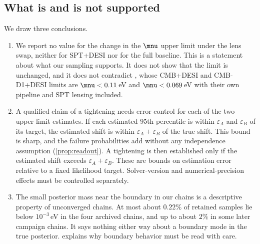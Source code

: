 \subsection{What is and is not supported}
We draw three conclusions.
\begin{enumerate}[leftmargin=*, itemsep=2pt]
  \item We report no value for the change in the $\mnu$ upper limit under the lens swap, neither for SPT+DESI nor for the full baseline. This is a statement about what our sampling supports. It does not show that the limit is unchanged, and it does not contradict \cite{arxiv2601_16277}, whose CMB+DESI and CMB-D1+DESI limits are $\mnu<0.11$\,eV and $\mnu<0.069$\,eV with their own pipeline and SPT lensing included.
  \item A qualified claim of a tightening needs error control for each of the two upper-limit estimates. If each estimated 95th percentile is within $\varepsilon_A$ and $\varepsilon_B$ of its target, the estimated shift is within $\varepsilon_A+\varepsilon_B$ of the true shift. This bound is sharp, and the failure probabilities add without any independence assumption (\cref{prop:readout}). A tightening is then established only if the estimated shift exceeds $\varepsilon_A+\varepsilon_B$. These are bounds on estimation error relative to a fixed likelihood target. Solver-version and numerical-precision effects must be controlled separately.
  \item The small posterior mass near the boundary in our chains is a descriptive property of unconverged chains. At most about $0.22\%$ of retained samples lie below $10^{-3}$\,eV in the four archived chains, and up to about $2\%$ in some later campaign chains. It says nothing either way about a boundary mode in the true posterior.  explains why boundary behavior must be read with care.
\end{enumerate}
